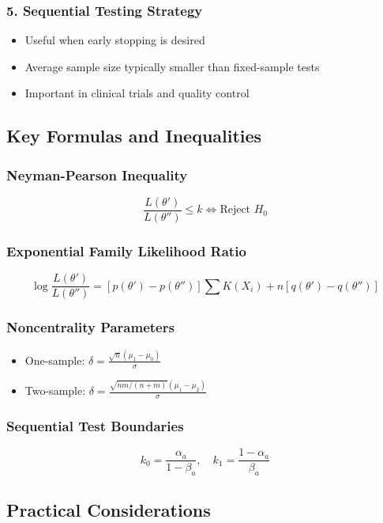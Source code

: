 \subsubsection{5. Sequential Testing Strategy}

\begin{itemize}
	\item Useful when early stopping is desired
	\item Average sample size typically smaller than fixed-sample tests
	\item Important in clinical trials and quality control
\end{itemize}

\subsection{Key Formulas and Inequalities}

\subsubsection{Neyman-Pearson Inequality}
\[
\frac{L(\theta')}{L(\theta'')} \leq k \Leftrightarrow \text{Reject } H_0
\]

\subsubsection{Exponential Family Likelihood Ratio}
\[
\log\frac{L(\theta')}{L(\theta'')} = [p(\theta') - p(\theta'')]\sum K(X_i) + n[q(\theta') - q(\theta'')]
\]

\subsubsection{Noncentrality Parameters}

\begin{itemize}
	\item One-sample: $\delta = \frac{\sqrt{n}(\mu_1 - \mu_0)}{\sigma}$
	\item Two-sample: $\delta = \frac{\sqrt{nm/(n+m)}(\mu_1 - \mu_2)}{\sigma}$
\end{itemize}

\subsubsection{Sequential Test Boundaries}
\[
k_0 = \frac{\alpha_a}{1-\beta_a}, \quad k_1 = \frac{1-\alpha_a}{\beta_a}
\]

\subsection{Practical Considerations}


